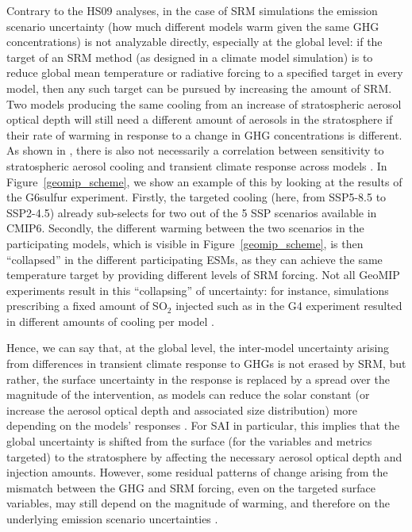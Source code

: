 \documentclass[draft]{agujournal2019}
\begin{document}
Contrary to the HS09 analyses, in the case of SRM simulations the emission scenario uncertainty (how much different models warm given the same GHG concentrations) is not analyzable directly, especially at the global level: if the target of an SRM method (as designed in a climate model simulation) is to reduce global mean temperature or radiative forcing to a specified target in every model, then any such target can be pursued by increasing the amount of SRM. Two models producing the same cooling from an increase of stratospheric aerosol optical depth will still need a different amount of aerosols in the stratosphere if their rate of warming in response to a change in GHG concentrations is different. As shown in , there is also not necessarily a correlation between sensitivity to stratospheric aerosol cooling and transient climate response across models \cite <similarly, independently verified in CMIP6 models for volcanic eruptions in>[]{Pauling2023}. In Figure~\ref{geomip_scheme}, we show an example of this by looking at the results of the G6sulfur experiment. Firstly, the targeted cooling (here, from SSP5-8.5 to SSP2-4.5) already sub-selects for two out of the 5 SSP scenarios available in CMIP6. Secondly, the different warming between the two scenarios in the participating models, which is visible in Figure~\ref{geomip_scheme}, is then ``collapsed'' in the different participating ESMs, as they can achieve the same temperature target by providing different levels of SRM forcing. Not all GeoMIP experiments result in this ``collapsing'' of uncertainty: for instance, simulations prescribing a fixed amount of SO$_2$ injected such as in the G4 experiment resulted in different amounts of cooling per model \cite{Plazzotta2018}.

Hence, we can say that, at the global level, the inter-model uncertainty arising from differences in transient climate response to GHGs is not erased by SRM, but rather, the surface uncertainty in the response is replaced by a spread over the magnitude of the intervention, as models can reduce the solar constant (or increase the aerosol optical depth and associated size distribution) more depending on the models' responses \cite{MacMartin2018_paris}. For SAI in particular, this implies that the global uncertainty is shifted from the surface (for the variables and metrics targeted) to the stratosphere by affecting the necessary aerosol optical depth and injection amounts. However, some residual patterns of change arising from the mismatch between the GHG and SRM forcing, even on the targeted surface variables, may still depend on the magnitude of warming, and therefore on the underlying emission scenario uncertainties \cite{Visioni2023,Zhang2024,henry2023comparison}.
\end{document}
